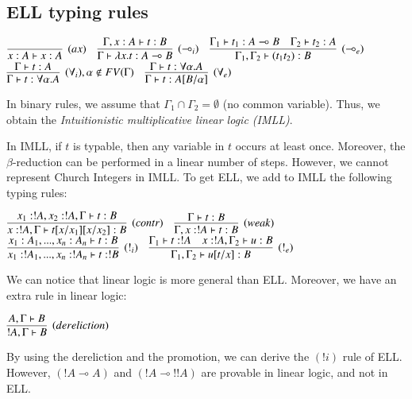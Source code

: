 \documentclass[a4paper,10pt]{article}
\newcommand{\limpl}{\multimap}  %
\begin{document}
\subsection{ELL typing rules}

\begin{center}
$	\infer[(ax)]{x:A \vdash x:A}{} \quad
	\infer[(\limpl_i)]{\Gamma \vdash \lambda x.t : A \limpl B}{\Gamma, x:A \vdash t:B} \quad
	\infer[(\limpl_e)]{\Gamma_1, \Gamma_2 \vdash (t_1 t_2) : B}{\Gamma_1 \vdash t_1 : A \limpl B & \Gamma_2 \vdash t_2 : A }$\\
\vspace{0.2cm}
$	\infer[(\forall_i), \alpha \notin FV(\Gamma)]{\Gamma \vdash t:\forall \alpha.A}{\Gamma \vdash t:A} \quad
	\infer[(\forall_e)]{\Gamma \vdash t:A[B/\alpha]}{\Gamma \vdash t:\forall \alpha.A}
$
\end{center}

In binary rules, we assume that $\Gamma_1 \cap \Gamma_2 = \emptyset$ (no common variable). Thus, we obtain the \emph{Intuitionistic multiplicative linear logic (IMLL)}.


In IMLL, if $t$ is typable, then any variable in $t$ occurs at least once. Moreover, the $\beta$-reduction can be performed in a linear number of steps. However, we cannot represent Church Integers in IMLL. To get ELL, we add to IMLL the following typing rules:

\begin{center}
$	\infer[(contr)]{x:!A, \Gamma \vdash t[x/x_1][x/x_2]:B}{x_1 : !A, x_2 : !A, \Gamma \vdash t : B } \quad
	\infer[(weak)]{\Gamma, x:!A \vdash t : B}{\Gamma \vdash t:B}$ \\
	\vspace{0.5cm}
$	\infer[(!_i)]{x_1 : !A_1, ..., x_n : !A_n \vdash t : !B}{x_1 : A_1, ..., x_n : A_n \vdash t : B} \quad
	\infer[(!_e)]{\Gamma_1, \Gamma_2 \vdash u[t/x] : B}{\Gamma_1 \vdash t:!A  &  x:!A,\Gamma_2 \vdash u:B}
$
\end{center}

 We can notice that linear logic is more general than ELL. Moreover, we have an extra rule in linear logic:
\begin{center}
$\infer[(dereliction)]{!A, \Gamma \vdash B}{A, \Gamma \vdash B }$
\end{center}

 By using the dereliction and the promotion, we can derive the $(!i)$ rule of ELL. However, $(!A \limpl A)$ and $(!A \limpl !!A)$ are provable in linear logic, and not in ELL.
\end{document}
